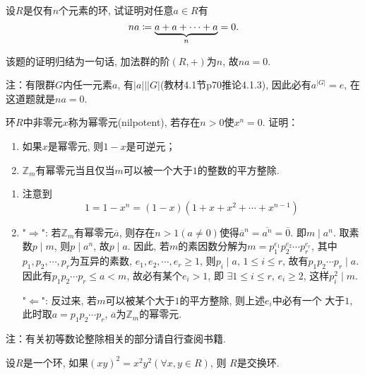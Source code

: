 \begin{problem}
    设$R$是仅有$n$个元素的环, 试证明对任意$a \in R$有
\[
    na \mathrel{\coloneqq} \underbrace{a + a + \cdots + a}_n = 0.
\]
\end{problem}
    
\begin{solution}
    该题的证明归结为一句话, 加法群的阶$(R, +)$为$n$, 故$na = 0$.

注：有限群$G$内任一元素$a$, 有$|a| \Big| |G|$(教材4.1节p70推论4.1.3),
因此必有$a^{|G|} = e$, 在这道题就是$na = 0$.
\end{solution}

\begin{problem}
    环$R$中非零元$x$称为幂零元(nilpotent), 若存在$n > 0$使$x^n = 0$. 证明：
\begin{enumerate}[(1)]
    \item 如果$x$是幂零元, 则$1 - x$是可逆元；
    \item $\mathbb{Z}_m$有幂零元当且仅当$m$可以被一个大于$1$的整数的平方整除.
\end{enumerate}
\end{problem}

\begin{solution}
\begin{enumerate}[(1)]
    \item 注意到
\[
    1 = 1 - x^n = (1 - x)(1 + x + x^2 + \cdots + x^{n - 1})
\]
    \item "$\Rightarrow$": 若$\mathbb{Z}_m$有幂零元$\overline{a}$,
    则存在$n > 1(a \neq 0)$使得$\overline{a}^n = \overline{a^n} = \overline{0}$.
    即$m \mid a^n$. 取素数$p \mid m$, 则$p \mid a^n$, 故$p \mid a$.
    因此, 若$m$的素因数分解为$m = p_1^{e_1}p_2^{e_2}\cdots p_r^{e_r}$,
    其中$p_1, p_2, \cdots, p_r$为互异的素数, $e_1, e_2, \cdots, e_r \geqslant 1$,
    则$p_i \mid a,\, 1 \leqslant i \leqslant r$, 故有$p_1p_2\cdots p_r \mid a$.
    因此有$p_1p_2\cdots p_r \leqslant a < m$, 故必有某个$e_i > 1$, 即
    $\exists 1 \leqslant i \leqslant r$, $e_i \geqslant 2$, 这样$p_i^2 \mid m$.

    "$\Leftarrow$": 反过来, 若$m$可以被某个大于$1$的平方整除, 则上述$e_i$中必有一个
    大于$1$, 此时取$a = p_1p_2\cdots p_r$, $\overline{a}$为$\mathbb{Z}_m$的幂零元.
\end{enumerate}
注：有关初等数论整除相关的部分请自行查阅书籍.
\end{solution}

\begin{problem}
    设$R$是一个环, 如果$(xy)^2 = x^2y^2 (\forall x, y \in R)$, 则
$R$是交换环.
\end{problem}

